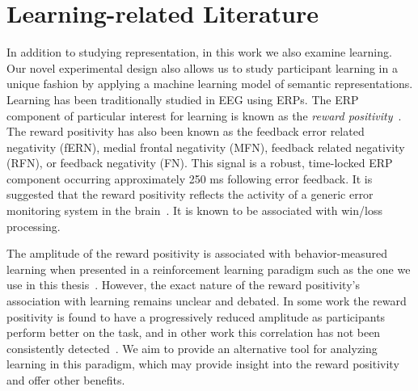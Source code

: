 \section{Learning-related Literature}

In addition to studying representation, in this work we also examine learning. 
Our novel experimental design also allows us to study participant learning in a 
unique fashion by applying a machine learning model of semantic 
representations. Learning has been traditionally studied in EEG using ERPs. The 
ERP component of particular interest for learning is known as the \emph{reward 
positivity}~\cite{proudfit2015reward}. The reward positivity has also been 
known as the feedback error related negativity (fERN), medial frontal 
negativity (MFN), feedback related negativity (RFN), or feedback negativity 
(FN). This signal is a robust, time-locked ERP component occurring 
approximately 250 ms following error feedback. It is suggested that the reward 
positivity reflects the activity of a generic error monitoring system in the 
brain~\cite{miltner1997event}. It is known to be associated with win/loss 
processing.

The amplitude of the reward positivity is associated with behavior-measured 
learning when presented in a reinforcement learning paradigm such as the one we 
use in this thesis~\cite{holroyd2002neural, sutton1998reinforcement, 
williams2017application}. However, the exact nature of the reward positivity's 
association with learning remains unclear and debated. In some work the reward 
positivity is found to have a progressively reduced amplitude as participants 
perform better on the task, and in other work this correlation has not been 
consistently detected~\cite{walsh2012learning}. We aim to provide an 
alternative tool for analyzing learning in this paradigm, which may provide 
insight into the reward positivity and offer other benefits.
